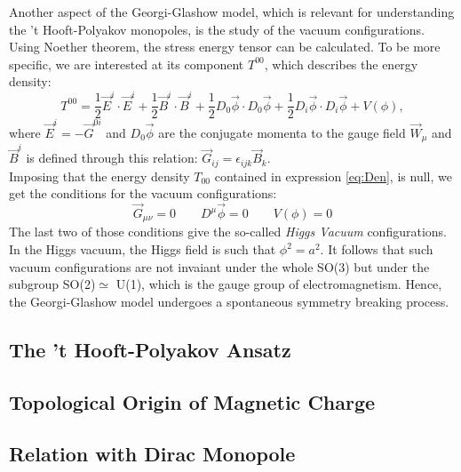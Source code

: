 \documentclass[main.tex]{subfiles}
\begin{document}
Another aspect of the Georgi-Glashow model, which is relevant for understanding the 't Hooft-Polyakov monopoles, is the study of the vacuum configurations.\\
Using Noether theorem, the stress energy tensor can be calculated. To be more specific, we are interested at its component $T^{00}$, which describes the energy density:
\begin{equation}
T^{00} = \frac{1}{2} \Vec{E}^i \cdot  \Vec{E}^i + \frac{1}{2} \Vec{B}^i \cdot \Vec{B}^i +\frac{1}{2} D_0 \Vec{\phi} \cdot D_0 \Vec{\phi} +\frac{1}{2} D_i \Vec{\phi} \cdot  D_i \Vec{\phi} + V(\phi),
\label{eq:Den}
\end{equation}
where $\Vec{E}^i = - \Vec{G}^{0i}$ and $D_0 \Vec{\phi}$ are the conjugate momenta to the gauge field $\Vec{W}_{\mu}$ and $\Vec{B}^i$ is defined through this relation: $ \Vec{G}_{ij} = \epsilon_{ijk} \Vec{B}_k$.\\
Imposing that the energy density $T_{00}$ contained in expression \ref{eq:Den}, is null, we get the conditions for the vacuum configurations:
\begin{equation}
\Vec{G}_{\mu \nu} = 0 \qquad D^{\mu} \Vec{\phi}  = 0 \qquad V(\phi)=0
\end{equation}
The last two of those conditions give the so-called \textit{Higgs Vacuum} configurations.
In the Higgs vacuum, the Higgs field is such that $\phi^2 = a^2$. It follows that such vacuum configurations are not invaiant under the whole SO(3) but under the subgroup SO(2)$\simeq$ U(1), which is the gauge group of electromagnetism. Hence, the Georgi-Glashow model undergoes a spontaneous symmetry breaking process.





\subsection{The 't Hooft-Polyakov Ansatz}
\subsection{Topological Origin of Magnetic Charge}
\subsection{Relation with Dirac Monopole}
\end{document}
